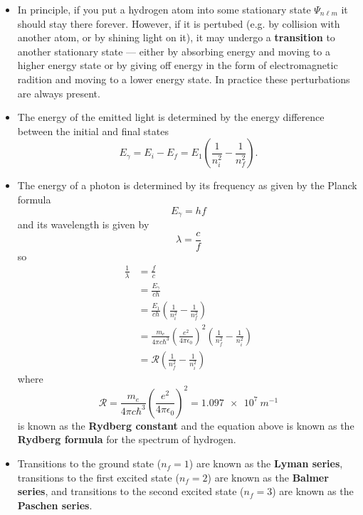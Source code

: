 \documentclass{article}
\begin{document}
\begin{itemize}
  \item In principle, if you put a hydrogen atom into some stationary state $\Psi_{n \ell m}$ it should stay there forever. However, if it is pertubed (e.g. by collision with another atom, or by shining light on it), it may undergo a \textbf{transition} to another stationary state — either by absorbing energy and moving to a higher energy state or by giving off energy in the form of electromagnetic radition and moving to a lower energy state. In practice these perturbations are always present.

  \item The energy of the emitted light is determined by the energy difference between the initial and final states \[E_\gamma = E_i - E_f = E_1 \left( \frac{1}{n_i^2} - \frac{1}{n_f^2} \right).\]

  \item The energy of a photon is determined by its frequency as given by the Planck formula \[E_\gamma = h f\] and its wavelength is given by \[\lambda = \frac{c}{f}\] so \begin{align*}
          \frac{1}{\lambda} & = \frac{f}{c}                                                                                                                \\
                            & = \frac{E_\gamma}{c h}                                                                                                       \\
                            & = \frac{E_1}{c h} \left( \frac{1}{n_i^2} - \frac{1}{n_f^2} \right)                                                           \\
                            & = \frac{m_e}{4 \pi c \hbar^3} \left( \frac{e^2}{4 \pi \epsilon_0} \right)^2 \left( \frac{1}{n_f^2} - \frac{1}{n_i^2} \right) \\
                            & = \mathcal{R} \left( \frac{1}{n_f^2} - \frac{1}{n_i^2} \right)
        \end{align*} where \[\mathcal{R} = \frac{m_e}{4 \pi c \hbar^3} \left( \frac{e^2}{4 \pi \epsilon_0} \right)^2 = \qty{1.097e7}{m^{-1}}\] is known as the \textbf{Rydberg constant} and the equation above is known as the \textbf{Rydberg formula} for the spectrum of hydrogen.

  \item Transitions to the ground state ($n_f = 1$) are known as the \textbf{Lyman series}, transitions to the first excited state ($n_f = 2$) are known as the \textbf{Balmer series}, and transitions to the second excited state ($n_f = 3$) are known as the \textbf{Paschen series}.
\end{itemize}
\end{document}
